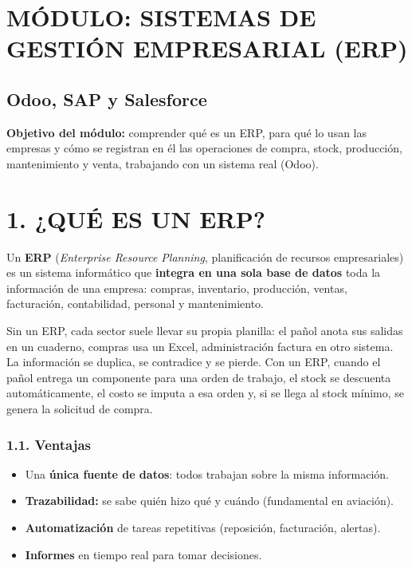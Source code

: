 \clearpage
\section*{MÓDULO: SISTEMAS DE GESTIÓN EMPRESARIAL (ERP)}
\subsection*{Odoo, SAP y Salesforce}

\begin{recuadro}
\textbf{Objetivo del módulo:} comprender qué es un ERP, para qué lo usan las empresas y cómo
se registran en él las operaciones de compra, stock, producción, mantenimiento y venta,
trabajando con un sistema real (Odoo).
\end{recuadro}

\section*{1. ¿QUÉ ES UN ERP?}

Un \textbf{ERP} (\textit{Enterprise Resource Planning}, planificación de recursos
empresariales) es un sistema informático que \textbf{integra en una sola base de datos} toda la
información de una empresa: compras, inventario, producción, ventas, facturación, contabilidad,
personal y mantenimiento.

Sin un ERP, cada sector suele llevar su propia planilla: el pañol anota sus salidas en un
cuaderno, compras usa un Excel, administración factura en otro sistema. La información se
duplica, se contradice y se pierde. Con un ERP, cuando el pañol entrega un componente para una
orden de trabajo, el stock se descuenta automáticamente, el costo se imputa a esa orden y, si
se llega al stock mínimo, se genera la solicitud de compra.

\subsubsection*{1.1. Ventajas}
\begin{itemize}
  \item Una \textbf{única fuente de datos}: todos trabajan sobre la misma información.
  \item \textbf{Trazabilidad:} se sabe quién hizo qué y cuándo (fundamental en aviación).
  \item \textbf{Automatización} de tareas repetitivas (reposición, facturación, alertas).
  \item \textbf{Informes} en tiempo real para tomar decisiones.
\end{itemize}

